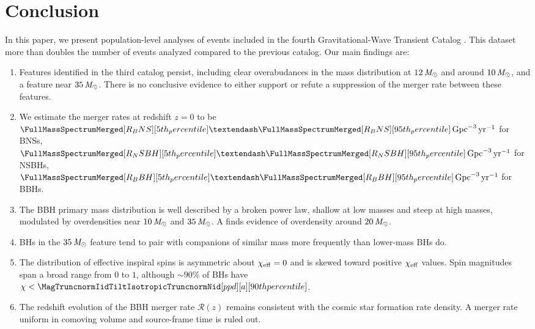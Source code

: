 \section{Conclusion}\label{sec:conclusion}
In this paper, we present population-level analyses of events included in the fourth Gravitational-Wave Transient Catalog \gwtcfour. This dataset more than doubles the number of events analyzed compared to the previous catalog. Our main findings are:

\begin{enumerate}

	\item Features identified in the third catalog \gwtcthree persist, including clear overabudances in the mass distribution at $1$\textendash$2\,\mathit{M_\odot}$ and around $ 10\, \mathit{M_\odot}$, and a feature near $35\,\mathit{M_\odot}$. There is no conclusive evidence to either support or refute a suppression of the merger rate between these features.

	\item We estimate the merger rates at redshift $z=0$ to be $\FullMassSpectrumMerged[R_BNS][5th_percentile]\textendash\FullMassSpectrumMerged[R_BNS][95th_percentile]\,\perGpcyr$ for \aclp{BNS}, $\FullMassSpectrumMerged[R_NSBH][5th_percentile]\textendash \FullMassSpectrumMerged[R_NSBH][95th_percentile]\,\perGpcyr$ for \aclp{NSBH}, $\FullMassSpectrumMerged[R_BBH][5th_percentile] \textendash\FullMassSpectrumMerged[R_BBH][95th_percentile]\,\perGpcyr$ for \aclp{BBH}.

	\item The \acl{BBH} primary mass distribution is well described by a broken power law, shallow at low masses and steep at high masses, modulated by overdensities near $10\, \mathit{M_\odot}$ and $35\,\mathit{M_\odot}$. A \nonparametric finds evidence of overdensity around $ 20\, \mathit{M_\odot}$.

	\item \Aclp{BH} in the $35\,\mathit{M_\odot}$ feature tend to pair with companions of similar mass more frequently than lower-mass \aclp{BH} do. 

	\item The distribution of effective inspiral spins is asymmetric about $\chi_{\rm eff}=0$ and is skewed toward positive $\chi_{\rm eff}$ values. Spin magnitudes span a broad range from $0$ to $1$, although ${\sim} 90\%$ of BHs have $\chi < \MagTruncnormIidTiltIsotropicTruncnormNid[ppd][a][90th percentile]$. 

	\item The redshift evolution of the \acl{BBH} merger rate $\mathcal{R}(z)$ remains consistent with the cosmic star formation rate density. A merger rate uniform in comoving volume and source-frame time is ruled out. 
	

\end{enumerate}
